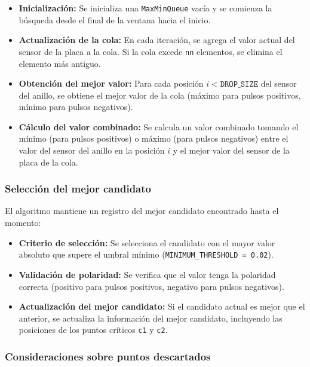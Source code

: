 \documentclass[12pt,a4paper]{article}
\begin{document}
\begin{itemize}
    \item \textbf{Inicialización:} Se inicializa una \texttt{MaxMinQueue} vacía y se comienza la búsqueda desde el final de la ventana hacia el inicio.
    
    \item \textbf{Actualización de la cola:} En cada iteración, se agrega el valor actual del sensor de la placa a la cola. Si la cola excede \texttt{nn} elementos, se elimina el elemento más antiguo.
    
    \item \textbf{Obtención del mejor valor:} Para cada posición $i < \texttt{DROP\_SIZE}$ del sensor del anillo, se obtiene el mejor valor de la cola (máximo para pulsos positivos, mínimo para pulsos negativos).
    
    \item \textbf{Cálculo del valor combinado:} Se calcula un valor combinado tomando el mínimo (para pulsos positivos) o máximo (para pulsos negativos) entre el valor del sensor del anillo en la posición $i$ y el mejor valor del sensor de la placa de la cola.
\end{itemize}

\subsubsection{Selección del mejor candidato}

El algoritmo mantiene un registro del mejor candidato encontrado hasta el momento:

\begin{itemize}
    \item \textbf{Criterio de selección:} Se selecciona el candidato con el mayor valor absoluto que supere el umbral mínimo (\texttt{MINIMUM\_THRESHOLD = 0.02}).
    
    \item \textbf{Validación de polaridad:} Se verifica que el valor tenga la polaridad correcta (positivo para pulsos positivos, negativo para pulsos negativos).
    
    \item \textbf{Actualización del mejor candidato:} Si el candidato actual es mejor que el anterior, se actualiza la información del mejor candidato, incluyendo las posiciones de los puntos críticos \texttt{c1} y \texttt{c2}.
\end{itemize}

\subsubsection{Consideraciones sobre puntos descartados}
\end{document}
